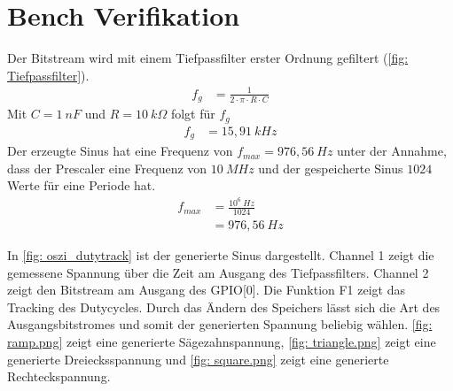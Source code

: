 \documentclass[./\jobname.tex]{subfiles}
\begin{document}
\section{Bench Verifikation}
%
Der Bitstream wird mit einem Tiefpassfilter erster Ordnung gefiltert (\autoref{fig: Tiefpassfilter}).
%
\begin{align}
f_{g}&= \frac{1}{2 \cdot \pi \cdot R \cdot C}
\end{align}
%
Mit \(C=1~nF\) und \(R=10~k\Omega\) folgt für \(f_{g}\)
%
\begin{align}
	f_{g}&= 15,91~kHz
\end{align}
%
Der erzeugte Sinus hat eine Frequenz von \(f_{max}=976,56~Hz\) unter der Annahme, dass der Prescaler eine Frequenz von \(10~MHz\) und der gespeicherte Sinus \(1024\) Werte für eine Periode hat.
%
\begin{align}
f_{max}&=\frac{10^{6}~Hz}{1024}\\
&=976,56~Hz
\end{align}
%
\def\bildA{false}
\begin{figure}[H]
	\centering
	\noindent{}
	\label{fig: Tiefpassfilter}
\end{figure}
%
In \autoref{fig: oszi_dutytrack} ist der generierte Sinus dargestellt. Channel 1 zeigt die gemessene Spannung über die Zeit am Ausgang des Tiefpassfilters. Channel 2 zeigt den Bitstream am Ausgang des GPIO[0]. Die Funktion F1 zeigt das Tracking des Dutycycles. Durch das Ändern des Speichers lässt sich die Art des Ausgangsbitstromes und somit der generierten Spannung beliebig wählen. \autoref{fig: ramp.png} zeigt eine generierte Sägezahnspannung, \autoref{fig: triangle.png} zeigt eine generierte Dreiecksspannung und \autoref{fig: square.png} zeigt eine generierte Rechteckspannung.
%
\begin{figure}[H]
	\centering
	\noindent{}
	\label{fig: oszi_dutytrack}
\end{figure}
%
\begin{figure}[H]
	\centering
	\noindent{}
	\label{fig: ramp.png}
\end{figure}
\end{document}
